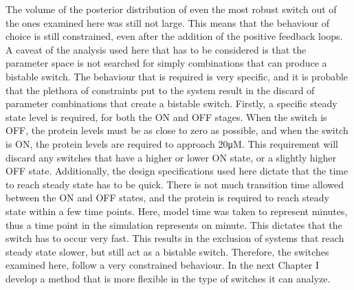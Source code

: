 The volume of the posterior distribution of even the most robust switch out of the ones examined here was still not large. This means that the behaviour of choice is still constrained, even after the addition of the positive feedback loops. A caveat of the analysis used here that has to be considered is that the parameter space is not searched for simply combinations that can produce a bistable switch. The behaviour that is required is very specific, and it is probable that the plethora of constraints put to the system result in the discard of parameter combinations that create a bistable switch. Firstly, a specific steady state level is required, for both the ON and OFF stages. When the switch is OFF, the protein levels must be as close to zero as possible, and when the switch is ON, the protein levels are required to approach 20μM. This requirement will discard any switches that have a higher or lower ON state, or a slightly higher OFF state. Additionally, the design specifications used here dictate that the time to reach steady state has to be quick. There is not much transition time allowed between the ON and OFF states, and the protein is required to reach steady state within a few time points. Here, model time was taken to represent minutes, thus a time point in the simulation represents on minute. This dictates that the switch has to occur very fast. This results in the exclusion of systems that reach steady state slower, but still act as a bistable switch. Therefore, the switches examined here, follow a very constrained behaviour. In the next Chapter I develop a method that is more flexible in the type of switches it can analyze.     

